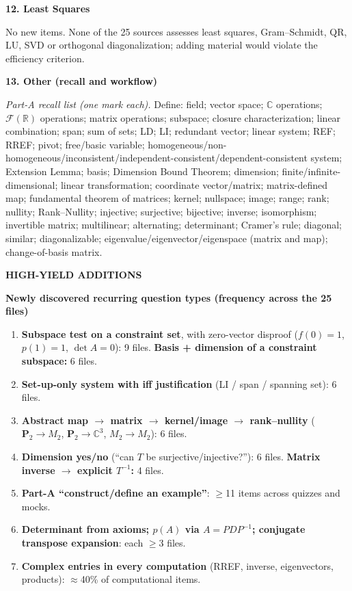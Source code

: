 \documentclass[9pt]{article}
\newcommand{\secn}[1]{\vspace{5pt}\par\noindent\begin{tcolorbox}[colback=NAVY,colframe=NAVY,boxrule=0pt,arc=2pt,left=5pt,top=1pt,bottom=1pt]\color{white}\bfseries\MakeUppercase{#1}\end{tcolorbox}\nopagebreak}
\newcommand{\sub}[1]{\vspace{3pt}\par{\bfseries\color{NAVY}#1}\nopagebreak\par}
\newcommand{\bi}[2]{\par\noindent\hangindent=1.25cm\hangafter=1\makebox[1.25cm][l]{\textbf{\footnotesize #1}}#2\par}
\begin{document}
\sub{12. Least Squares}
No new items. None of the 25 sources assesses least squares, Gram--Schmidt, QR, LU, SVD or orthogonal diagonalization; adding material would violate the efficiency criterion.

\sub{13. Other (recall and workflow)}
\bi{OT1}{\textit{Part-A recall list (one mark each).} Define: field; vector space; $\mathbb C$ operations; $\mathcal F(\mathbb R)$ operations; matrix operations; subspace; closure characterization; linear combination; span; sum of sets; LD; LI; redundant vector; linear system; REF; RREF; pivot; free/basic variable; homogeneous/non-homogeneous/inconsistent/independent-consistent/dependent-consistent system; Extension Lemma; basis; Dimension Bound Theorem; dimension; finite/infinite-dimensional; linear transformation; coordinate vector/matrix; matrix-defined map; fundamental theorem of matrices; kernel; nullspace; image; range; rank; nullity; Rank--Nullity; injective; surjective; bijective; inverse; isomorphism; invertible matrix; multilinear; alternating; determinant; Cramer's rule; diagonal; similar; diagonalizable; eigenvalue/eigenvector/eigenspace (matrix and map); change-of-basis matrix.}
\secn{High-Yield Additions}
\sub{Newly discovered recurring question types (frequency across the 25 files)}
\begin{enumerate}[leftmargin=1.5em,itemsep=0pt,topsep=1pt]
\item \textbf{Subspace test on a constraint set}, with zero-vector disproof ($f(0)=1$, $p(1)=1$, $\det A=0$): 9 files. \textbf{Basis + dimension of a constraint subspace:} 6 files.
\item \textbf{Set-up-only system with iff justification} (LI / span / spanning set): 6 files.
\item \textbf{Abstract map $\to$ matrix $\to$ kernel/image $\to$ rank--nullity} ($\mathbf P_2\to M_2$, $\mathbf P_2\to\mathbb C^3$, $M_2\to M_2$): 6 files.
\item \textbf{Dimension yes/no} (``can $T$ be surjective/injective?''): 6 files. \textbf{Matrix inverse $\to$ explicit $T^{-1}$:} 4 files.
\item \textbf{Part-A ``construct/define an example''}: $\ge$11 items across quizzes and mocks.
\item \textbf{Determinant from axioms; $p(A)$ via $A=PDP^{-1}$; conjugate transpose expansion}: each $\ge$3 files.
\item \textbf{Complex entries in every computation} (RREF, inverse, eigenvectors, products): $\approx$40\% of computational items.
\end{enumerate}
\end{document}
